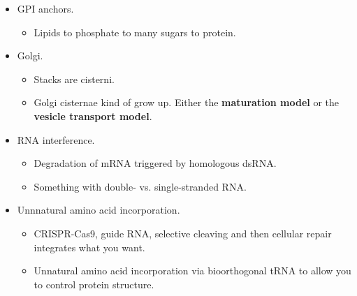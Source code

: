 \documentclass[../notes.tex]{subfiles}
\begin{document}
\begin{itemize}
    \item GPI anchors.
    \begin{itemize}
        \item Lipids to phosphate to many sugars to protein.
    \end{itemize}
    \item Golgi.
    \begin{itemize}
        \item Stacks are cisterni.
        \item Golgi cisternae kind of grow up. Either the \textbf{maturation model} or the \textbf{vesicle transport model}.
    \end{itemize}
    \item RNA interference.
    \begin{itemize}
        \item Degradation of mRNA triggered by homologous dsRNA.
        \item Something with double- vs. single-stranded RNA.
    \end{itemize}
    \item Unnnatural amino acid incorporation.
    \begin{itemize}
        \item CRISPR-Cas9, guide RNA, selective cleaving and then cellular repair integrates what you want.
        \item Unnatural amino acid incorporation via bioorthogonal tRNA to allow you to control protein structure.
    \end{itemize}
\end{itemize}
\end{document}
